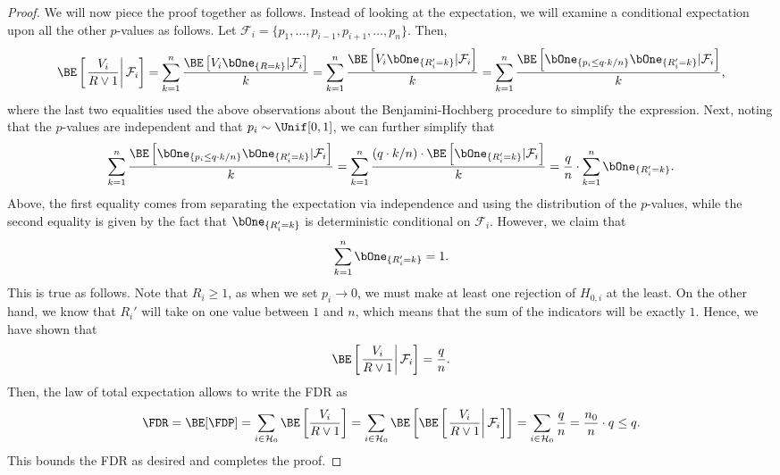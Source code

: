 \begin{proof}
We will now piece the proof together as follows. Instead of looking at the expectation, we will examine a conditional expectation upon all the other $p$-values as follows. Let $\mathcal{F}_i = \{ p_1, \ldots, p_{i-1}, p_{i+1}, \ldots, p_n \}$. Then,
\begin{equation}
\BE \left[ \left. \frac{V_i}{R \vee 1} \right| \mathcal{F}_i  \right] = \sum_{k=1}^n \frac{\BE\left[ V_i \bOne_{\{R = k\}} | \mathcal{F}_i \right]}{k} = \sum_{k=1}^n \frac{\BE\left[ V_i \bOne_{\{ R_i' = k \}} | \mathcal{F}_i \right]}{k} =  \sum_{k=1}^n \frac{\BE\left[ \bOne_{\{ p_i \leq q \cdot k / n \}} \bOne_{\{ R_i' = k \}} | \mathcal{F}_i \right]}{k},
\end{equation}
where the last two equalities used the above observations about the Benjamini-Hochberg procedure to simplify the expression. Next, noting that the $p$-values are independent and that $p_i \sim \Unif[0,1]$, we can further simplify that
\begin{equation}
\sum_{k=1}^n \frac{\BE\left[ \bOne_{\{ p_i \leq q \cdot k / n \}} \bOne_{\{ R_i' = k \}} | \mathcal{F}_i \right]}{k} = \sum_{k=1}^n \frac{\left( q \cdot k / n \right) \cdot \BE\left[ \bOne_{\{ R_i' = k \}} | \mathcal{F}_i \right]}{k} = \frac{q}{n} \cdot \sum_{k=1}^n \bOne_{\{ R_i' = k \}}.
\end{equation}
Above, the first equality comes from separating the expectation via independence and using the distribution of the $p$-values, while the second equality is given by the fact that $\bOne_{\{ R_i' = k \}}$ is deterministic conditional on $\mathcal{F}_i$. However, we claim that
\begin{equation}
 \sum_{k=1}^n \bOne_{\{ R_i' = k \}} = 1.
\end{equation} This is true as follows. Note that $R_i \geq 1$, as when we set $p_i \to 0$, we must make at least one rejection of $H_{0, i}$ at the least. On the other hand, we know that $R_i'$ will take on one value between $1$ and $n$, which means that the sum of the indicators will be exactly $1$. Hence, we have shown that
\[ \BE \left[ \left. \frac{V_i}{R \vee 1} \right| \mathcal{F}_i  \right] = \frac{q}{n}. \] Then, the law of total expectation allows to write the FDR as
\[ \FDR = \BE[\FDP] = \sum_{i \in \mathcal{H}_0} \BE\left[ \frac{V_i}{R \vee 1} \right] = \sum_{i \in \mathcal{H}_0} \BE \left[ \BE\left[ \left. \frac{V_i}{R \vee 1}  \right| \mathcal{F}_i \right] \right] = \sum_{i \in \mathcal{H}_0} \frac{q}{n} = \frac{n_0}{n} \cdot q \leq q.  \] This bounds the FDR as desired and completes the proof.
\end{proof}